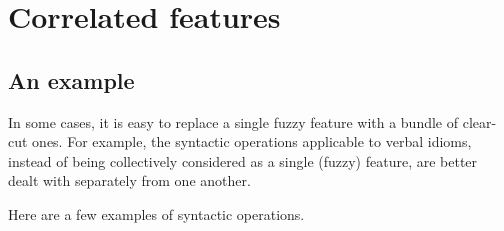 \documentclass[output=paper]{langsci/langscibook}
\begin{document}
\section{Correlated features}
\label{sec:3}

\label{correlatedfeatures}

\subsection{An example} 

In some cases, it is easy to replace a single fuzzy feature with a bundle of clear-cut ones. For example, the syntactic operations applicable to verbal idioms, instead of being collectively considered as a single (fuzzy) feature, are better dealt with separately from one another.

Here are a few examples of syntactic operations.
\end{document}
